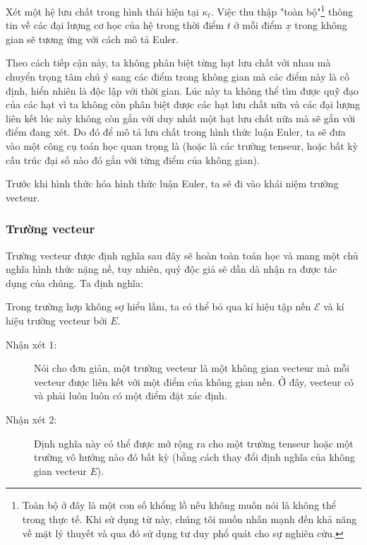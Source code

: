 \documentclass[../../../main.tex]{subfiles}
\begin{document}
	Xét một hệ lưu chất trong hình thái hiện tại $\kappa_t$. Việc thu thập "toàn bộ"\footnote{Toàn bộ ở đây là một con số khổng lồ nếu không muốn nói là không thể trong thực tế. Khi sử dụng từ này, chúng tôi muốn nhấn mạnh đến khả năng về mặt lý thuyết và qua đó sử dụng tư duy phổ quát cho sự nghiên cứu.} thông tin về các đại lượng cơ học của hệ trong thời điểm $t$ ở mỗi điểm $\underline{x}$ trong không gian sẽ tương ứng với cách mô tả Euler.
	
	Theo cách tiếp cận này, ta không phân biệt từng hạt lưu chất với nhau mà chuyển trọng tâm chú ý sang các điểm trong không gian mà các điểm này là cố định, hiển nhiên là độc lập với thời gian. Lúc này ta không thể tìm được quỹ đạo của các hạt vì ta không còn phân biệt được các hạt lưu chất nữa và các đại lượng liên kết lúc này không còn gắn với duy nhất một hạt lưu chất nữa mà sẽ gắn với điểm đang xét. Do đó để mô tả lưu chất trong hình thức luận Euler, ta sẽ đưa vào một công cụ toán học quan trọng là  (hoặc là các trường tenseur, hoặc bất kỳ cấu trúc đại số nào đó gắn với từng điểm của không gian).

	Trước khi hình thức hóa hình thức luận Euler, ta sẽ đi vào khái niệm trường vecteur.
\subsubsection{Trường vecteur}
	Trường vecteur được định nghĩa sau đây sẽ hoàn toàn toán học và mang một chủ nghĩa hình thức nặng nề, tuy nhiên, quý độc giả sẽ dần dà nhận ra được tác dụng của chúng. Ta định nghĩa:
		\begin{quotation}
		\end{quotation}
	Trong trường hợp không sợ hiểu lầm, ta có thể bỏ qua kí hiệu tập nền $\mathscr{E}$ và kí hiệu trường vecteur bởi $E$.	
	\begin{description}
		\item[Nhận xét 1:] Nói cho đơn giản, một trường vecteur là một   không gian vecteur mà mỗi vecteur được liên kết với một điểm của không gian nền. Ở đây, vecteur có và phải luôn luôn có một điểm đặt xác định.
		\item[Nhận xét 2:] Định nghĩa này có thể được mở rộng ra cho một trường tenseur hoặc một trường vô hướng nào đó bất kỳ (bằng cách thay đổi định nghĩa của không gian vecteur $E$).
	\end{description}
\end{document}
